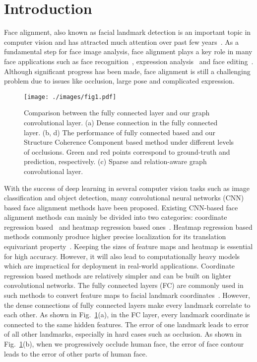 \documentclass[runningheads]{llncs}
\begin{document}
\section{Introduction}
Face alignment, also known as facial landmark detection is an important topic in computer vision and has attracted much attention over past few years~\cite{lab,wing,DeCaFA,DVLN}.
As a fundamental step for face image analysis, face alignment plays a key role in many face applications such as face recognition~\cite{facerecogn1}, expression analysis~\cite{faceAU} and face editing~\cite{face2face}. 
Although significant progress has been made, face alignment is still a challenging problem due to issues like occlusion, large pose and complicated expression.

\begin{figure}[h]
	\centering
	\texttt{[image: ./images/fig1.pdf]}
	\caption{Comparison between the fully connected layer and our graph convolutional layer. (a) Dense connection in the fully connected layer. (b, d) The performance of fully connected based and our Structure Coherence Component based method under different levels of occlusions. Green and red points correspond to ground-truth and prediction, respectively.  (c) Sparse and relation-aware graph convolutional layer.}
	\label{fig:motivation}
\end{figure}

With the success of deep learning in several computer vision tasks such as image classification and object detection, many convolutional neural networks (CNN) based face alignment methods have been proposed.
Existing CNN-based face alignment methods can mainly be divided into two categories: coordinate regression based~\cite{Trigeorgis,wing,lab} and heatmap regression based ones~\cite{HGAlign,DeCaFA,HRNet}. 
Heatmap regression based methods commonly produce higher precise localization for its translation equivariant property~\cite{cohen2016group}.
Keeping the sizes of feature maps and heatmap is essential for high accuracy. However, it will also lead to computationally heavy models which are impractical for deployment in real-world applications.
{Coordinate regression based methods} are relatively simpler and can be built on lighter convolutional networks. 
The fully connected layers (FC) are commonly used in such methods to convert feature maps to facial landmark coordinates~\cite{Trigeorgis,wing,lab}.
However, the dense connections of fully connected layers make every landmark correlate to each other. 
As shown in Fig.~\ref{fig:motivation}(a), in the FC layer, every landmark coordinate is connected to the same hidden features.
The error of one landmark leads to error of all other landmarks, especially in hard cases such as occlusion. As shown in Fig.~\ref{fig:motivation}(b), when we progressively occlude human face, the error of face contour leads to the error of other parts of human face. 
\end{document}
